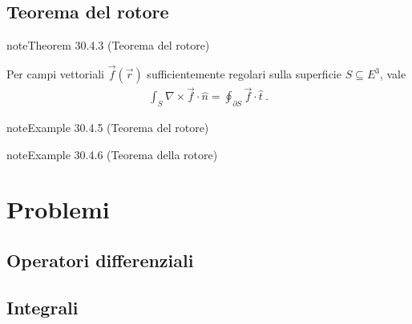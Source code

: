\documentclass[letterpaper,10pt,italian]{jupyterBook}
\begin{document}
\subsection{Teorema del rotore}
\label{\detokenize{ch/vector-calculus/stokes:teorema-del-rotore}}\label{\detokenize{ch/vector-calculus/stokes:vector-calculus-stokes-curl}}\label{ch/vector-calculus/stokes:thm-curl}
\begin{sphinxadmonition}{note}{Theorem 30.4.3 (Teorema del rotore)}



\sphinxAtStartPar
Per campi vettoriali \(\vec{f}(\vec{r})\) sufficientemente regolari sulla superficie \(S \subseteq E^3\), vale
\begin{equation}\label{equation:ch/vector-calculus/stokes:eq:thm-curl}
\begin{split}\int_{S} \nabla \times \vec{f} \cdot \hat{n} = \oint_{\partial S} \vec{f} \cdot \hat{t} \ .\end{split}
\end{equation}\end{sphinxadmonition}
\label{ch/vector-calculus/stokes:thm-curl-1}
\begin{sphinxadmonition}{note}{Example 30.4.5 (Teorema del rotore)}


\end{sphinxadmonition}
\label{ch/vector-calculus/stokes:thm-curl-2}
\begin{sphinxadmonition}{note}{Example 30.4.6 (Teorema della rotore)}


\end{sphinxadmonition}

\sphinxstepscope


\section{Problemi}
\label{\detokenize{ch/vector-calculus/problems:problemi}}\label{\detokenize{ch/vector-calculus/problems:vector-calculus-problems}}\label{\detokenize{ch/vector-calculus/problems::doc}}

\subsection{Operatori differenziali}
\label{\detokenize{ch/vector-calculus/problems:operatori-differenziali}}\label{\detokenize{ch/vector-calculus/problems:vector-calculus-problems-derivatives}}

\subsection{Integrali}
\label{\detokenize{ch/vector-calculus/problems:integrali}}\label{\detokenize{ch/vector-calculus/problems:vector-calculus-problems-integrals}}
\end{document}
